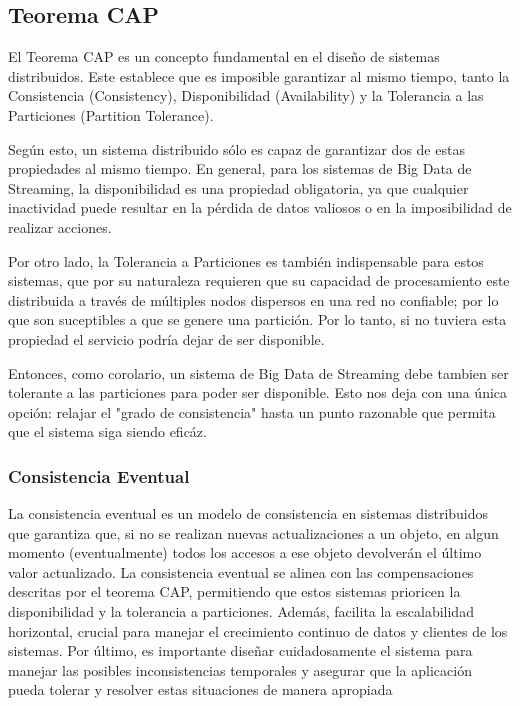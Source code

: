 \subsection{Teorema CAP}
El Teorema CAP es un concepto fundamental en el diseño de sistemas distribuidos. 
Este establece que es imposible garantizar al mismo tiempo, tanto la Consistencia (Consistency), 
Disponibilidad (Availability) y la Tolerancia a las Particiones (Partition Tolerance).

Según esto, un sistema distribuido sólo es capaz de garantizar dos de estas propiedades al mismo tiempo. 
En general, para los sistemas de Big Data de Streaming, la disponibilidad es una propiedad obligatoria, ya que cualquier inactividad puede 
resultar en la pérdida de datos valiosos o en la imposibilidad de realizar acciones.

Por otro lado, la Tolerancia a Particiones es también indispensable para estos sistemas, que por su naturaleza requieren que su capacidad de 
procesamiento este distribuida a través de múltiples nodos dispersos en una red no confiable; por lo que son suceptibles 
a que se genere una partición. Por lo tanto, si no tuviera esta propiedad el servicio podría dejar de ser disponible. 

Entonces, como corolario, un sistema de Big Data de Streaming debe tambien ser tolerante a las particiones para poder ser disponible.
Esto nos deja con una única opción: relajar el "grado de consistencia" hasta un punto razonable que permita que el sistema siga siendo eficáz.\parencite{capteo}
\subsubsection{Consistencia Eventual}
La consistencia eventual es un modelo de consistencia en sistemas distribuidos que garantiza que, 
si no se realizan nuevas actualizaciones a un objeto, en algun momento (eventualmente) todos los accesos a ese objeto 
devolverán el último valor actualizado.  
La consistencia eventual se alinea con las compensaciones descritas por el teorema CAP, 
permitiendo que estos sistemas prioricen la disponibilidad y la tolerancia a particiones. 
Además, facilita la escalabilidad horizontal, crucial para manejar el crecimiento continuo de datos y clientes de los sistemas.
Por último, es importante diseñar cuidadosamente el sistema para manejar las posibles inconsistencias temporales 
y asegurar que la aplicación pueda tolerar y resolver estas situaciones de manera apropiada \parencite{capteo}

